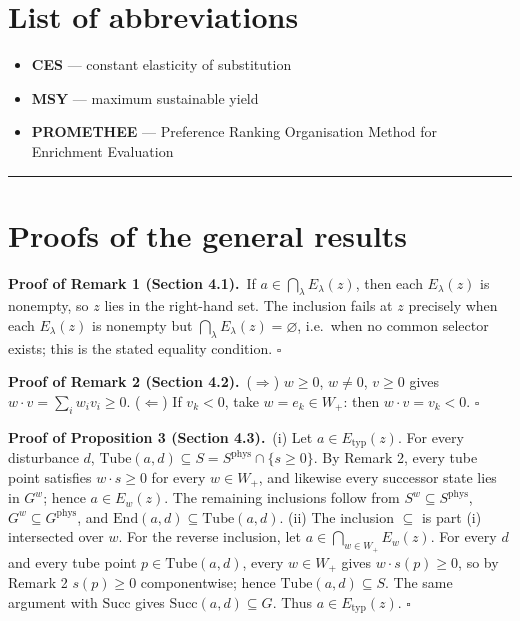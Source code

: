 \documentclass[3p,11pt]{elsarticle}
\begin{document}
\section*{List of abbreviations}\label{list-of-abbreviations}

\begin{itemize}
\item \textbf{CES} --- constant elasticity of substitution
\item \textbf{MSY} --- maximum sustainable yield
\item \textbf{PROMETHEE} --- Preference Ranking Organisation Method for Enrichment Evaluation
\end{itemize}

\begin{center}\rule{0.5\linewidth}{0.5pt}\end{center}


\appendix

\section{Proofs of the general results}

\textbf{Proof of Remark 1 (Section 4.1).}\ If \(a \in \bigcap_\lambda E_\lambda(z)\), then each
\(E_\lambda(z)\) is nonempty, so \(z\) lies in the right-hand set. The
inclusion fails at \(z\) precisely when each \(E_\lambda(z)\) is
nonempty but \(\bigcap_\lambda E_\lambda(z) = \varnothing\), i.e.~when
no common selector exists; this is the stated equality condition. \ensuremath{\square}

\textbf{Proof of Remark 2 (Section 4.2).}\ (\(\Rightarrow\)) \(w \ge 0\), \(w \neq 0\), \(v \ge 0\)
gives \(w \cdot v = \sum_i w_i v_i \ge 0\). (\(\Leftarrow\)) If
\(v_k < 0\), take \(w = e_k \in W_+\): then \(w \cdot v = v_k < 0\). \ensuremath{\square}

\textbf{Proof of Proposition 3 (Section 4.3).}\ (i) Let \(a \in E_{\mathrm{typ}}(z)\). For every
disturbance \(d\),
\(\mathrm{Tube}(a,d) \subseteq S = S^{\mathrm{phys}} \cap \{s \ge 0\}\).
By Remark 2, every tube point satisfies \(w \cdot s \ge 0\) for every
\(w \in W_+\), and likewise every successor state lies in \(G^w\); hence
\(a \in E_w(z)\). The remaining inclusions follow from
\(S^w \subseteq S^{\mathrm{phys}}\),
\(G^w \subseteq G^{\mathrm{phys}}\), and
\(\mathrm{End}(a,d) \subseteq \mathrm{Tube}(a,d)\). (ii) The inclusion
\(\subseteq\) is part (i) intersected over \(w\). For the reverse
inclusion, let \(a \in \bigcap_{w \in W_+} E_w(z)\). For every \(d\) and
every tube point \(p \in \mathrm{Tube}(a,d)\), every \(w \in W_+\) gives
\(w \cdot s(p) \ge 0\), so by Remark 2 \(s(p) \ge 0\) componentwise;
hence \(\mathrm{Tube}(a,d) \subseteq S\). The same argument with
\(\mathrm{Succ}\) gives \(\mathrm{Succ}(a,d) \subseteq G\). Thus
\(a \in E_{\mathrm{typ}}(z)\). \ensuremath{\square}
\end{document}
